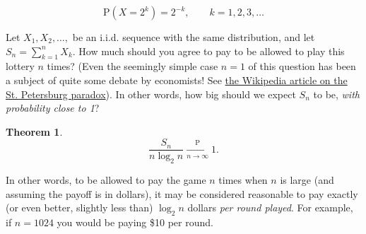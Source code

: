 \documentclass[11pt]{report}
\theoremstyle{plain}
\newtheorem{thm}{Theorem}[chapter]
\theoremstyle{definition}
\begin{document}
\[
\mathrm{P}(X=2^k) = 2^{-k}, \qquad k=1,2,3,\ldots
\]

\noindent Let $X_1,X_2,\ldots,$ be an i.i.d. sequence with the
same distribution, and let $S_n = \sum_{k=1}^n X_k$.
How much should you agree to pay to be allowed to play
this lottery $n$ times? (Even the seemingly simple
case $n=1$ of this question  has been a subject of
quite some debate by economists! See \href{http://en.wikipedia.org/wiki/St._Petersburg_paradox}{the Wikipedia
article on the St. Petersburg
paradox}).
In other words, how big should we expect $S_n$ to be,
\emph{with probability close to 1}?

\begin{thm}

\[
\frac{S_n}{n\log_2 n} \xrightarrow[n\to\infty]{\mathrm{P}} 1.
\]

\end{thm}

\noindent In other words, to be allowed to pay the game $n$
times when $n$ is large (and assuming the payoff is
in dollars), it may be considered reasonable to pay
exactly (or even better, slightly less than)
$\log_2 n$ dollars \emph{per round played}. For example,
if $n=1024$ you would be paying \$10 per round.
\end{document}
